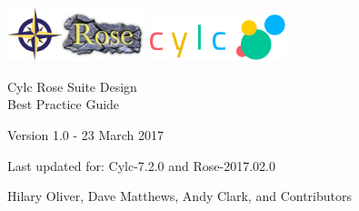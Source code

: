 \thispagestyle{empty}

\begin{titlepage}
    \begin{center}
        \includegraphics[width=0.3\textwidth]{resources/png/rose-logo}
        \includegraphics[width=0.3\textwidth]{resources/tex/cylc-logo}

        \Huge{Cylc Rose Suite Design\\Best Practice Guide}

      \small{Version 1.0 - 23 March 2017}

      \small{Last updated for: Cylc-7.2.0 and Rose-2017.02.0}

        \large{Hilary Oliver, Dave Matthews, Andy Clark, and Contributors}
    \end{center}
\end{titlepage}
